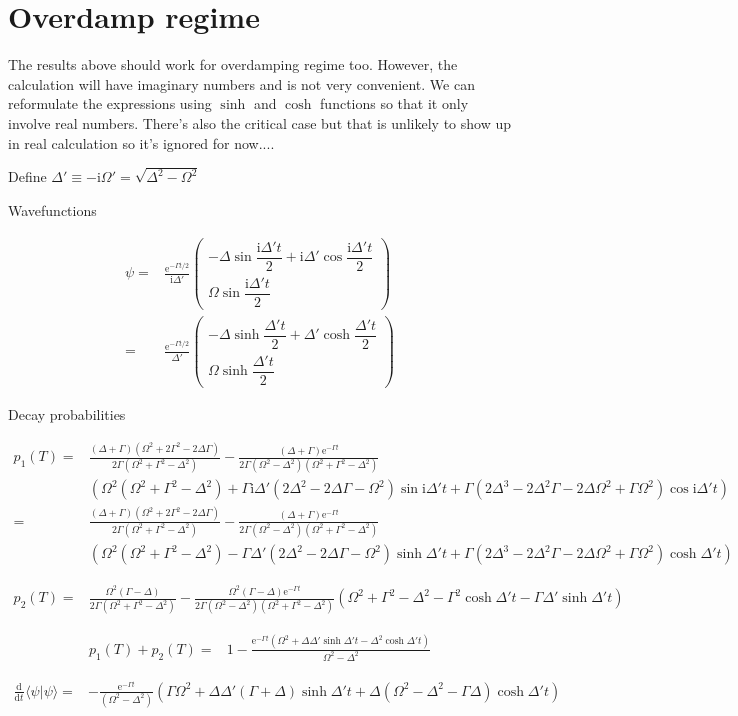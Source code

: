 \documentclass[10pt,fleqn]{article}
\newcommand{\ud}{\mathrm{d}}
\newcommand{\ue}{\mathrm{e}}
\newcommand{\ui}{\mathrm{i}}
\newcommand{\eqar}[1]
{
  \begin{align*}
    #1
  \end{align*}
}
\newcommand{\paren}[1]{{\left({#1}\right)}}
\newcommand{\diff}[3][{}]{{\frac{\ud^{#1} {#2}}{\ud {#3}{}^{#1}}}}
\begin{document}
\section{Overdamp regime}
The results above should work for overdamping regime too.
However, the calculation will have imaginary numbers and is not very convenient.
We can reformulate the expressions using $\sinh$ and $\cosh$ functions so that it only involve
real numbers. There's also the critical case but that is unlikely to show up in real calculation
so it's ignored for now....

Define $\Delta'\equiv-\ui\Omega'=\sqrt{\Delta^2-\Omega^2}$

Wavefunctions
\eqar{
  \psi=&\frac{\ue^{-\Gamma t/2}}{\ui\Delta'}\begin{pmatrix}
    -\Delta\sin\dfrac{\ui\Delta't}{2}+\ui\Delta'\cos\dfrac{\ui\Delta't}{2}\\
    \Omega\sin\dfrac{\ui\Delta't}{2}
  \end{pmatrix}\\
  =&\frac{\ue^{-\Gamma t/2}}{\Delta'}\begin{pmatrix}
    -\Delta\sinh\dfrac{\Delta't}{2}+\Delta'\cosh\dfrac{\Delta't}{2}\\
    \Omega\sinh\dfrac{\Delta't}{2}
  \end{pmatrix}
}
Decay probabilities
\eqar{
  p_1(T)=&\frac{\paren{\Delta+\Gamma}\paren{\Omega^2+2\Gamma^2-2\Delta\Gamma}}{2\Gamma\paren{\Omega^2+\Gamma^2-\Delta^2}}-\frac{\paren{\Delta+\Gamma}\ue^{-\Gamma t}}{2\Gamma\paren{\Omega^2-\Delta^2}\paren{\Omega^2+\Gamma^2-\Delta^2}}\\
  &\paren{\Omega^2\paren{\Omega^2+\Gamma^2-\Delta^2}+\Gamma\ui\Delta'\paren{2\Delta^2-2\Delta\Gamma-\Omega^2}\sin\ui\Delta't+\Gamma\paren{2\Delta^3-2\Delta^2\Gamma-2\Delta\Omega^2+\Gamma\Omega^2}\cos\ui\Delta't}\\
  =&\frac{\paren{\Delta+\Gamma}\paren{\Omega^2+2\Gamma^2-2\Delta\Gamma}}{2\Gamma\paren{\Omega^2+\Gamma^2-\Delta^2}}-\frac{\paren{\Delta+\Gamma}\ue^{-\Gamma t}}{2\Gamma\paren{\Omega^2-\Delta^2}\paren{\Omega^2+\Gamma^2-\Delta^2}}\\
  &\paren{\Omega^2\paren{\Omega^2+\Gamma^2-\Delta^2}-\Gamma\Delta'\paren{2\Delta^2-2\Delta\Gamma-\Omega^2}\sinh\Delta't+\Gamma\paren{2\Delta^3-2\Delta^2\Gamma-2\Delta\Omega^2+\Gamma\Omega^2}\cosh\Delta't}
}
\eqar{
  p_2(T)=&\frac{\Omega^2\paren{\Gamma-\Delta}}{2\Gamma\paren{\Omega^2+\Gamma^2-\Delta^2}}-\frac{\Omega^2\paren{\Gamma-\Delta}\ue^{-\Gamma t}}{2\Gamma\paren{\Omega^2-\Delta^2}\paren{\Omega^2+\Gamma^2-\Delta^2}}\paren{\Omega^2+\Gamma^2-\Delta^2-\Gamma^2\cosh\Delta't-\Gamma\Delta'\sinh\Delta't}
}
\eqar{
  p_1(T)+p_2(T)=&1-\frac{\ue^{-\Gamma t}\paren{\Omega^2+\Delta\Delta'\sinh\Delta't-\Delta^2\cosh\Delta't}}{\Omega^2-\Delta^2}
}
\eqar{
  \diff{}{t}\langle\psi|\psi\rangle=&-\frac{\ue^{-\Gamma t}}{\paren{\Omega^2-\Delta^2}}\paren{
    \Gamma\Omega^2+\Delta\Delta'\paren{\Gamma+\Delta}\sinh\Delta't+\Delta\paren{\Omega^2-\Delta^2-\Gamma\Delta}\cosh\Delta't
  }
}
\end{document}

